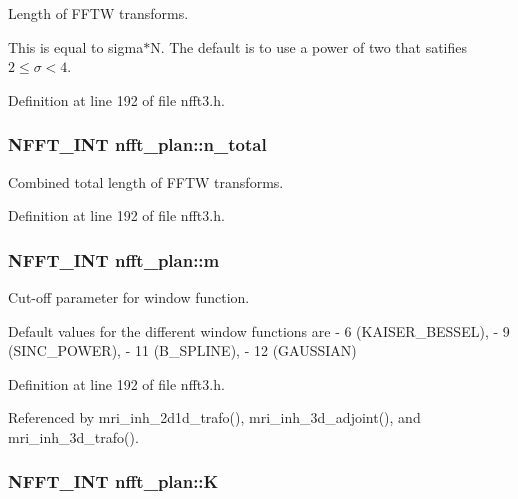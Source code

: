 Length of F\-F\-T\-W transforms. 

This is equal to sigma$\ast$\-N. The default is to use a power of two that satifies $2\le\sigma<4$. 

Definition at line 192 of file nfft3.\-h.

\hypertarget{structnfft__plan_a9ffe9fb93c209bfc0d6a1386cb450379}{
\subsubsection[{n\-\_\-total}]{\setlength{\rightskip}{0pt plus 5cm}N\-F\-F\-T\-\_\-\-I\-N\-T nfft\-\_\-plan\-::n\-\_\-total}}\label{structnfft__plan_a9ffe9fb93c209bfc0d6a1386cb450379}


Combined total length of F\-F\-T\-W transforms. 



Definition at line 192 of file nfft3.\-h.

\hypertarget{structnfft__plan_aa465d49bdc08234cb1544fcbc0376c4a}{
\subsubsection[{m}]{\setlength{\rightskip}{0pt plus 5cm}N\-F\-F\-T\-\_\-\-I\-N\-T nfft\-\_\-plan\-::m}}\label{structnfft__plan_aa465d49bdc08234cb1544fcbc0376c4a}


Cut-\/off parameter for window function. 

Default values for the different window functions are -\/ 6 (K\-A\-I\-S\-E\-R\-\_\-\-B\-E\-S\-S\-E\-L), -\/ 9 (S\-I\-N\-C\-\_\-\-P\-O\-W\-E\-R), -\/ 11 (B\-\_\-\-S\-P\-L\-I\-N\-E), -\/ 12 (G\-A\-U\-S\-S\-I\-A\-N) 

Definition at line 192 of file nfft3.\-h.



Referenced by mri\-\_\-inh\-\_\-2d1d\-\_\-trafo(), mri\-\_\-inh\-\_\-3d\-\_\-adjoint(), and mri\-\_\-inh\-\_\-3d\-\_\-trafo().

\hypertarget{structnfft__plan_a81032c3e1764804561a17941166a9272}{
\subsubsection[{K}]{\setlength{\rightskip}{0pt plus 5cm}N\-F\-F\-T\-\_\-\-I\-N\-T nfft\-\_\-plan\-::\-K}}\label{structnfft__plan_a81032c3e1764804561a17941166a9272}


